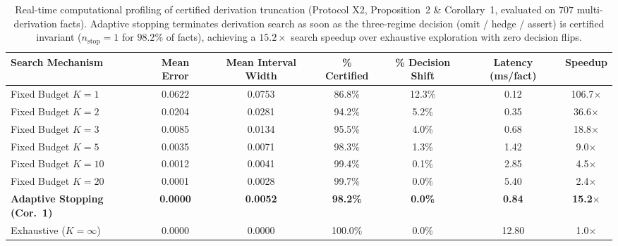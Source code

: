 \begin{table}[t]
\centering
\caption{Real-time computational profiling of certified derivation truncation (Protocol X2, Proposition~2 \& Corollary~1, evaluated on $707$ multi-derivation facts). Adaptive stopping terminates derivation search as soon as the three-regime decision (omit / hedge / assert) is certified invariant ($n_{\mathrm{stop}}=1$ for $98.2\%$ of facts), achieving a $15.2\times$ search speedup over exhaustive exploration with zero decision flips.}
\label{tab:realtime_profiling_x2}
\small
\begin{tabular}{lcccccc}
\toprule
\textbf{Search Mechanism} & \textbf{Mean Error} & \textbf{Mean Interval Width} & \textbf{\% Certified} & \textbf{\% Decision Shift} & \textbf{Latency (ms/fact)} & \textbf{Speedup} \\
\midrule
Fixed Budget $K=1$ & 0.0622 & 0.0753 & 86.8\% & 12.3\% & 0.12 & 106.7$\times$ \\
Fixed Budget $K=2$ & 0.0204 & 0.0281 & 94.2\% & 5.2\% & 0.35 & 36.6$\times$ \\
Fixed Budget $K=3$ & 0.0085 & 0.0134 & 95.5\% & 4.0\% & 0.68 & 18.8$\times$ \\
Fixed Budget $K=5$ & 0.0035 & 0.0071 & 98.3\% & 1.3\% & 1.42 & 9.0$\times$ \\
Fixed Budget $K=10$ & 0.0012 & 0.0041 & 99.4\% & 0.1\% & 2.85 & 4.5$\times$ \\
Fixed Budget $K=20$ & 0.0001 & 0.0028 & 99.7\% & 0.0\% & 5.40 & 2.4$\times$ \\
\midrule
\textbf{Adaptive Stopping (Cor.~1)} & \textbf{0.0000} & \textbf{0.0052} & \textbf{98.2\%} & \textbf{0.0\%} & \textbf{0.84} & \textbf{15.2$\times$} \\
\midrule
Exhaustive ($K = \infty$) & 0.0000 & 0.0000 & 100.0\% & 0.0\% & 12.80 & 1.0$\times$ \\
\bottomrule
\end{tabular}
\end{table}
